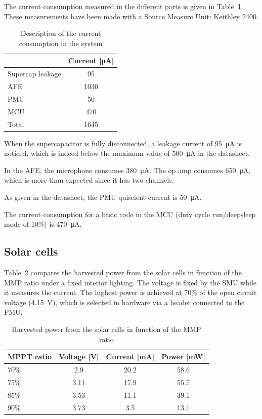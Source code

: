 \documentclass{EPL-master-thesis-covers-EN}
\begin{document}
The current consumption measured in the different parts is given in Table~\ref{tab:val_current_cons}. These measurements have been made with a Source Measure Unit: Keithley 2400.

\begin{table}[H]
\centering
\begin{tabular}{lc}
\hline
                     & Current [\si{\micro A}]  \\ \hline
 Supercap leakage    & 95                       \\
 AFE                 & 1030                     \\
 PMU                 & 50                       \\
 MCU                 & 470                      \\ \hline
 Total               & 1645                     \\ \hline
\end{tabular}
\caption{Description of the current consumption in the system}
\label{tab:val_current_cons}
\end{table}

When the supercapacitor is fully disconnected, a leakage current of \SI{95}{\micro A} is noticed, which is indeed below the maximum value of \SI{500}{\micro A} in the datasheet.

In the AFE, the microphone consumes \SI{380}{\micro A}. The op amp consumes \SI{650}{\micro A}, which is more than expected since it has two channels.

As given in the datasheet, the PMU quiscient current is \SI{50}{\micro A}.

The current consumption for a basic code in the MCU (duty cycle run/deepsleep mode of 10\%) is \SI{470}{\micro A}.

\subsection*{Solar cells}

Table~\ref{tab:val_current_solar_sel} compares the harvested power from the solar cells in function of the MMP ratio under a fixed interior lighting. The voltage is fixed by the SMU while it measures the current. The highest power is achieved at 70\% of the open circuit voltage (\SI{4.15}{V}), which is selected in hardware via a header connected to the PMU.

\begin{table}[H]
\centering
\begin{tabular}{lccc}
\hline
  MPPT ratio & Voltage [V] & Current [mA] & Power [mW]  \\ \hline
 70\%        & 2.9         & 20.2         & 58.6        \\
 75\%        & 3.11        & 17.9         & 55.7        \\
 85\%        & 3.53        & 11.1         & 39.1        \\
 90\%        & 3.73        & 3.5          & 13.1        \\ \hline
\end{tabular}
\caption{Harvested power from the solar cells in function of the MMP ratio}
\label{tab:val_current_solar_sel}
\end{table}
\end{document}
